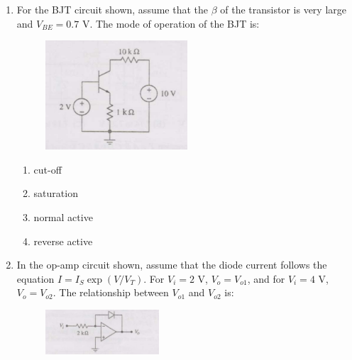 \documentclass[journal,12pt,onecolumn]{IEEEtran}
\theoremstyle{remark}
\begin{document}
\begin{enumerate}
\hfill{}

\begin{multicols}{4}
\begin{enumerate}
  \item $-2$ V
  \item $-1$ V
  \item $-0.5$ V
  \item $0.5$ V
\end{enumerate}
\end{multicols}

\item For the BJT circuit shown, assume that the $\beta$ of the transistor is very large and $V_{BE} = 0.7\text{ V}$. The mode of operation of the BJT is: 

\begin{figure}[ht!]
    \centering
    \includegraphics[width=0.5\textwidth]{Q37.png}
    \caption{}
    \label{fig:Q37.png}
\end{figure}

\hfill{}
\begin{multicols}{4}
\begin{enumerate}
  \item cut-off
  \item saturation
  \item normal active
  \item reverse active
\end{enumerate}
\end{multicols}

\item In the op-amp circuit shown, assume that the diode current follows the equation $I = I_S \exp(V/V_T)$. For $V_i = 2\text{ V}$, $V_o = V_{o1}$, and for $V_i = 4\text{ V}$, $V_o = V_{o2}$. The relationship between $V_{o1}$ and $V_{o2}$ is: 

\begin{figure}[ht!]
    \centering
    \includegraphics[width=0.4\textwidth]{Q38.png}
    \caption{}
    \label{fig:Q38.png}
\end{figure}



\end{enumerate}
\end{document}
